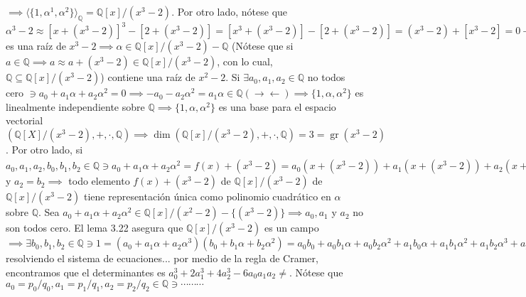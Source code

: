 \begin{ejemplo}
    $\implies \langle\{1,\alpha^1,\alpha^2\} \rangle_{\mathbb{Q}}=\mathbb{Q}[x]/(x^3-2)$. Por otro lado, nótese que $\alpha^3 -2 \approx [x+(x^3-2)]^3-[2+(x^3-2)]=[x^3+(x^3-2)]-[2+(x^3-2)]= (x^3-2)+[x^3-2]=0+[x^3-2]=[x^3-2]\approx 0\implies \alpha$ es una raíz de $x^3-2\implies \alpha \in\mathbb{Q}[x]/(x^3-2)-\mathbb{Q}$ (Nótese que si $a\in\mathbb{Q}\implies a\approx a +(x^3-2)\in \mathbb{Q}[x]/(x^3-2)$, con lo cual, $\mathbb{Q}\subseteq \mathbb{Q}[x]/(x^3-2)$) contiene una raíz de $x^2-2$. Si $\exists a_0,a_1,a_2\in\mathbb{Q}$ no todos cero $\ni a_0+a_1\alpha +a_2\alpha^2=0\implies -a_0-a_2\alpha^2 =a_1\alpha \in\mathbb{Q}(\to\gets)\implies \{1,\alpha,\alpha^2\}$ es linealmente independiente sobre $\mathbb{Q}\implies \{1,\alpha,\alpha^2\}$ es una base para el espacio vectorial $(\mathbb{Q}[X]/(x^3-2),+,\cdot, \mathbb{Q})\implies \operatorname{dim}\left(\mathbb{Q}[x]/(x^3-2),+,\cdot, \mathbb{Q}\right)=3=\operatorname{gr}(x^3-2)$. Por otro lado, si $a_0,a_1,a_2,b_0,b_1,b_2\in \mathbb{Q}\ni a_0+a_1\alpha +a_2\alpha^2 =f(x)+(x^3-2)=a_0(x+(x^3-2))+a_1(x+(x^3-2))+a_2(x+(x^3-2))^2=f(x)+(x^2-2)=b_0(x^0+(x^3-2))+b_1(x+(x^3-2))+b^2(x^2+(x^2-2))\implies (a_0-b_0)(x^0+(x^3-2))+(a_1-b_1)(x+(x^2-2))+(a_2-b_2)(x^2+(x^3-2))=(a_0-b_0)+(a_1-b_1)x+(a_2-b_2)x^2+[x^2-2]=[x^3-2]=0+[x^2-2]\implies (a_0-b_0)+(a_1-b_1)x+(a_2-b_2)x^2\equiv 0 \mod (x^2-2)\implies x^3-2|(a_0-b_0)+(a_1-b_1)x+(a_2-b_2)x^2\implies a_0-b_0=a_1-b_1 = a_2-b_2=0\implies a_0=b_0,a_1=b_1$ y $a_2=b_2\implies$ todo elemento $f(x)+(x^3-2)$ de $\mathbb{Q}[x]/(x^3-2)$ de $\mathbb{Q}[x]/(x^3-2)$ tiene representación única como polinomio cuadrático en $\alpha$ sobre $\mathbb{Q}$. \break 
    Sea $a_0+a_1\alpha +a_2\alpha^2\in \mathbb{Q}[x]/(x^2-2)-\{(x^3-2)\}\implies a_0,a_1$ y $a_2$ no son todos cero. El lema 3.22 asegura que $\mathbb{Q}[x]/(x^3-2)$ es un campo $\implies \exists b_0,b_1,b_2\in\mathbb{Q}\ni 1=(a_0+a_1\alpha +a_2\alpha^3)(b_0+b_1\alpha +b_2\alpha^2)= a_0b_0+a_0b_1\alpha +a_0b_2\alpha^2 +a_1b_0\alpha +a_1b_1\alpha^2 +a_1b_2\alpha^3 +a_2b_0\alpha^2 +a_2b_1\alpha^3+a_2b_2\alpha^4 = a_0b_0 +a_0b_1\alpha + a_0b_2\alpha^2 + a_1b_0\alpha +a_0b_1\alpha^2+2a_1b_2+ a_2b_0\alpha^2 +2a_2b_1 + 2a_2b_2\alpha = (a_0b_0 + 2a_1+b_2+2a_2b_1)+(a_0b_1 +a_1b_0+2a_2b_2)+(a_0b_2+a_1b_1+a_2b_0)\alpha^2\implies$ resolviendo el sistema de ecuaciones... por medio de la regla de Cramer, encontramos que el determinantes es $a_0^3+2a_1^3+4a_2^3- 6a_0a_1a_2\neq$. Nótese que $a_0=p_0/q_0,a_1=p_1/q_1,a_2=p_2/q_2\in \mathbb{Q}\ni \cdots \cdots \cdots $
\end{ejemplo}